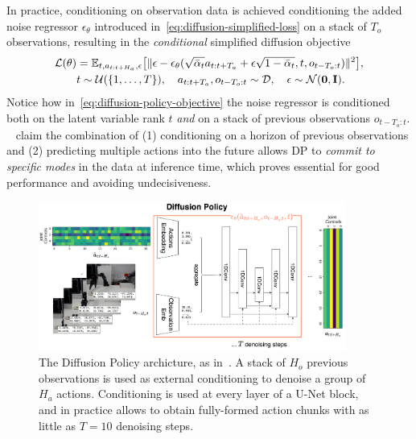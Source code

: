 In practice, conditioning on observation data is achieved conditioning the added noise regressor \( \epsilon_\theta \) introduced in~\ref{eq:diffusion-simplified-loss} on a stack of \( T_o \) observations, resulting in the \emph{conditional} simplified diffusion objective
\begin{align}
    \mathcal L(\theta) &= \mathbb{E}_{t, a_{t:t+H_a}, \epsilon} \big[
        \Vert \epsilon - \epsilon_\theta(\sqrt{\bar \alpha_t} a_{t:t+T_a} + \epsilon \sqrt{1 - \bar \alpha_t}, t, o_{t-T_o:t}) \Vert^2 \big], \label{eq:diffusion-policy-objective} \\
        & t \sim \mathcal{U}(\{1,\dots,T\}), \quad
        a_{t:t+T_a}, o_{t-T_o:t} \sim \mathcal{D}, \quad
        \epsilon \sim \mathcal{N}(\mathbf{0},\mathbf{I}). \notag 
\end{align}
Notice how in~\ref{eq:diffusion-policy-objective} the noise regressor is conditioned both on the latent variable rank \( t \) \emph{and} on a stack of previous observations \(o_{t-T_o:t} \).
~\citet{chiDiffusionPolicyVisuomotor2024} claim the combination of (1) conditioning on a horizon of previous observations and (2) predicting multiple actions into the future allows DP to \emph{commit to specific modes} in the data at inference time, which proves essential for good performance and avoiding undecisiveness.

\begin{figure}
    \centering
    \includegraphics[width=0.9\textwidth]{figures/ch4/ch4-diffusion-policy.png}
    \caption{The Diffusion Policy archicture, as in~\citet{chiDiffusionPolicyVisuomotor2024}. A stack of \( H_o \) previous observations is used as external conditioning to denoise a group of \( H_a \) actions. Conditioning is used at every layer of a U-Net block, and in practice allows to obtain fully-formed action chunks with as little as \(T=10\) denoising steps.}
    \label{fig:diffusion-policy-architecture}
\end{figure}

